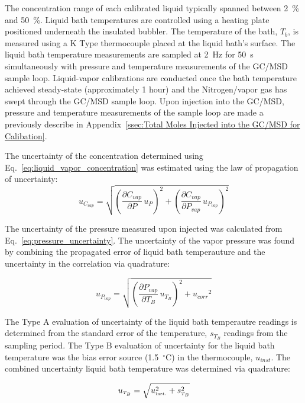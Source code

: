 \documentclass[12pt]{article}
\begin{document}
The concentration range of each calibrated liquid typically spanned between 2~\% and 50~\%. Liquid bath temperatures are controlled using a heating plate positioned underneath the insulated bubbler. The temperature of the bath, $T_{b}$, is measured using a K Type thermocouple placed at the liquid bath's surface. The liquid bath temperature measurements are sampled at 2~\si{Hz} for 50~\si{s} simultaneously with pressure and temperature measurements of the GC/MSD sample loop. Liquid-vapor calibrations are conducted once the bath temperature achieved steady-state (approximately 1 hour) and the Nitrogen/vapor gas has swept through the GC/MSD sample loop. Upon injection into the GC/MSD, pressure and temperature measurements of the sample loop are made a previously describe in Appendix~\ref{ssec:Total Moles Injected into the GC/MSD for Calibation}.

The uncertainty of the concentration determined using Eq.~\ref{eq:liquid_vapor_concentration} was estimated using the law of propagation of uncertainty:
\begin{equation}
\label{eq:vapor_concentration_uncertainty}
u_{\scriptscriptstyle C_{vap}} = \sqrt{{\left( \frac{\partial C_{vap}}{\partial P}\,u_{\scriptscriptstyle P} \right) }^2+{\left(\frac{\partial C_{vap}}{\partial P_{vap}}\,u_{\scriptscriptstyle P_{vap}}\right)}^2}
\end{equation}

The uncertainty of the pressure measured upon injected was calculated from Eq.~\ref{eq:pressure_uncertainty}. The uncertainty of the vapor pressure was found by combining the propagated error of liquid bath temperauture and the uncertainty in the correlation via quadrature:

\begin{equation}
\label{eq:vapor_concentration_uncertainty}
u_{\scriptscriptstyle P_{vap}} = \sqrt{{\left(\frac{\partial P_{vap}}{\partial T_{B}}\,u_{\scriptscriptstyle T_{B}} \right)}^2+{u_{corr}}^2}
\end{equation}

The Type A evaluation of uncertainty of the liquid bath temperautre readings is determined from the standard error of the temperature, $s_{T_{B}}$ readings from the sampling period. The Type B evaluation of uncertainty for the liquid bath temperature was the bias error source (1.5~$^\circ$C) in the thermocouple, $u_{inst}$. The combined uncertainty liquid bath temperature was determined via quadrature:

\begin{equation}
\label{eq:temp_bath_uncertainty}
u_{\scriptscriptstyle T_{B}} = \sqrt{u_{\rm \scriptscriptstyle inst.}^2 + s_{\scriptscriptstyle T_{B}}^2}
\end{equation}
\end{document}
